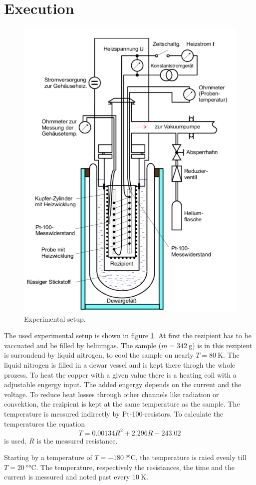 \section{Execution}
\label{sec:Durchführung}

\begin{figure}
    \centering 
    \includegraphics[width=.8\textwidth]{Bilder/Aufbau.PNG}
    \caption{Experimental setup.}
    \label{fig:Aufbau}
\end{figure}


The used experimental setup is shown in figure \ref{fig:Aufbau}.
At first the rezipient has to be vaccuated and be filled by heliumgas.
The sample ($m=\SI{342}{\g}$) is in this rezipient is surrondend by liquid nitrogen, to cool the sample on nearly $T=\SI{80}{\kelvin}$. 
The liquid nitrogen is filled in a dewar vessel and is kept there throgh the whole prozess.
To heat the copper with a given value there is a heating coil with a adjustable engergy input.
The added engergy depends on the current and the voltage.
To reduce heat losses through other channels like radiation or convektion, the rezipient is kept at the same temperature as the sample.
The temperature is messured indirectly by Pt-100-resistors.
To calculate the temperatures the equation
\begin{equation}
    T = 0.00134 R^2 + 2.296 R - 243.02
\end{equation}
is used.
$R$ is the messured resistance.




Starting by a temperature of $T=\SI{-180}{\degree\celsius}$, the temperature is raied evenly till $T=\SI{20}{\degree\celsius}$. 
The temperature, respectively the resistances, the time and the current is messured and noted past every $\SI{10}{\kelvin}$.
